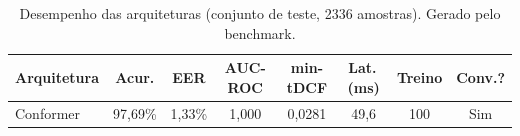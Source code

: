 \begin{table}[H]
\centering
\caption{Desempenho das arquiteturas (conjunto de teste, 2336 amostras). Gerado pelo benchmark.}
\label{tab:bench_resultados}
\small\singlespacing
\begin{tabular}{lccccccc}
\toprule
\textbf{Arquitetura} & \textbf{Acur.} & \textbf{EER} & \textbf{AUC-ROC} & \textbf{min-tDCF} & \textbf{Lat.\,(ms)} & \textbf{Treino} & \textbf{Conv.?} \\
\midrule
Conformer & 97,69\% & 1,33\% & 1,000 & 0,0281 & 49,6 & 100 & \textcolor{successgreen}{Sim} \\
\bottomrule
\end{tabular}
\end{table}
